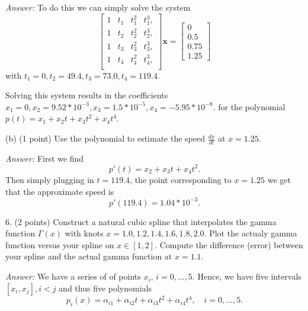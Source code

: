 \documentclass{article}
\newenvironment{answer}{\textit{Answer:}}{}
\begin{document}
\begin{answer}
    To do this we can simply solve the system
    \begin{equation*}
        \begin{bmatrix}
            1 & t_1 & t_1^2 & t_1^3, \\
            1 & t_2 & t_2^2 & t_2^3, \\
            1 & t_3 & t_3^2 & t_3^3, \\
            1 & t_4 & t_4^2 & t_4^3, \\
        \end{bmatrix}\bm{x} =
        \begin{bmatrix}
            0 \\ 0.5 \\ 0.75 \\ 1.25
        \end{bmatrix}
    \end{equation*}
    with $t_1 = 0, t_2 = 49.4, t_3 = 73.0, t_4 = 119.4$.

    Solving this system results in the coefficients
    $x_1 = 0, x_2 = 9.52*10^{-3}, x_3 = 1.5*10^{-5}, x_4=-5.95*10^{-8}$.
    for the polynomial $p(t) = x_1 + x_2 t + x_3t^2 + x_4t^4$.
\end{answer}

(b) (1 point) Use the polynomial to estimate the speed $\frac{dx}{dt}$ at
$x = 1.25$.

\begin{answer}
    First we find
    \begin{equation*}
        p'(t) = x_2 + x_3 t + x_4 t^2.
    \end{equation*}
    Then simply plugging in $t=119.4$, the point corresponding to $x=1.25$
    we get that the approximate speed is
    \begin{equation*}
        p'(119.4) = 1.04*10^{-3}.
    \end{equation*}
\end{answer}

6. (2 points) Construct a natural cubic spline that interpolates the gamma
function $\Gamma(x)$ with knots $x = 1.0, 1.2, 1.4, 1.6, 1.8, 2.0$.
Plot the actualy gamma function versus your spline on $x \in [1,2]$.
Compute the difference (error) between your spline and the actual gamma
function at $x = 1.1$.

\begin{answer}
    We have a series of of points $x_i$, $i = 0,...,5$. Hence, we have five
    intervals $[x_i, x_j], i < j$ and thus five polynomials
    \begin{equation*}
        p_i(x) = \alpha_{i1} + \alpha_{i2} t + \alpha_{i3} t^2 + \alpha_{i4}t^4,
        \quad i = 0,\dots,5.
    \end{equation*}


\end{answer}
\end{document}
